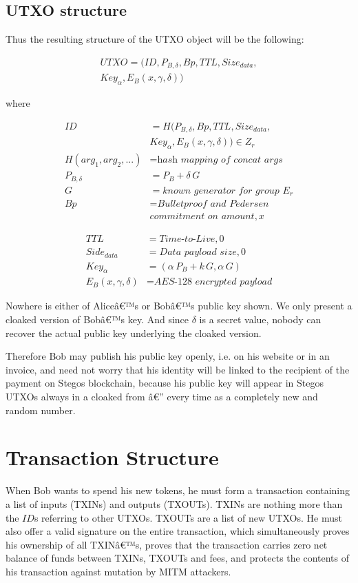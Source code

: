 \documentclass[8pt,fleqn,openany]{book}
\begin{document}
{		\subsection{UTXO structure}
		Thus the resulting structure of the UTXO object will be the following:
		
		\begin{multline*}
		UTXO = (ID, P_{B, \delta}, Bp, TTL, Size_{data},\\
		Key_{\alpha}, E_B(x, \gamma, \delta))
		\end{multline*}
		
		where
		
		\begin{align*}
		ID &= H(P_{B, \delta}, Bp, TTL, Size_{data}, \\ 
		& Key_{\alpha}, E_B(x, \gamma, \delta)) \in Z_r \\
		H(arg_1, arg_2, ...) &= \textit{hash mapping of concat args} \\
		P_{B, \delta} &= P_B + \delta \, G \\
		G &= \textit{known generator for group } E_r \\
		Bp &= \textit{Bulletproof and Pedersen} \\
		& \textit{commitment on amount}, x 
		\end{align*}
		
		\begin{align*}
		TTL &= \textit{Time-to-Live}, 0 \\
		Side_{data} &= \textit{Data payload size}, 0 \\
		Key_{\alpha} &= (\alpha \, P_{B} + k \, G, \alpha \, G ) \\
		E_B(x, \gamma, \delta) &= \textit{AES-128 encrypted payload}
		\end{align*}
		
		Nowhere is either of Aliceâ€™s or Bobâ€™s public key shown. We only present a cloaked version of Bobâ€™s key. And since $\delta$ is a secret value, nobody can recover the actual public key underlying the cloaked version. 
		
		Therefore Bob may publish his public key openly, i.e. on his website or in an invoice, and need not worry that his identity will be linked to the recipient of the payment on Stegos blockchain, because his public key will appear in Stegos UTXOs always in a cloaked from â€” every time as a completely new and random number.
		
		\section{Transaction Structure}
		When Bob wants to spend his new tokens, he must form a transaction containing a list of inputs (TXINs) and outputs (TXOUTs). TXINs are nothing more than the $\mathit{ID}$s referring to other UTXOs. TXOUTs are a list of new UTXOs. He must also offer a valid signature on the entire transaction, which simultaneously proves his ownership of all TXINâ€™s, proves that the transaction carries zero net balance of funds between TXINs, TXOUTs and fees, and protects the contents of his transaction against mutation by MITM attackers.
		
}
\end{document}
